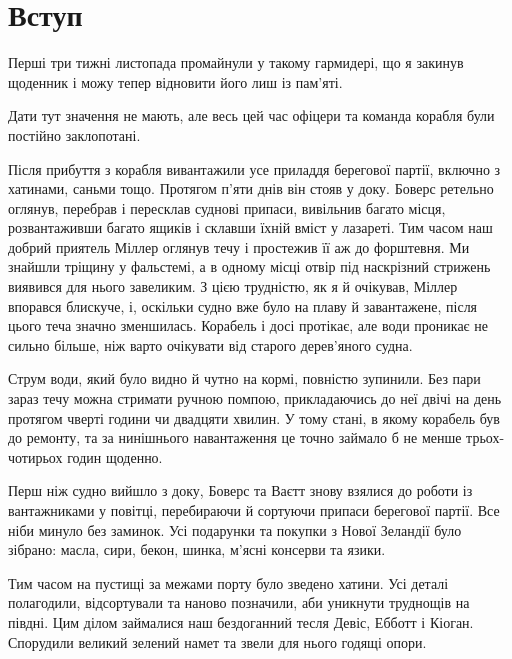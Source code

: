  
 
 
 
 

\section{Вступ}

Перші три тижні листопада промайнули у такому гармидері, що я закинув щоденник
і можу тепер відновити його лиш із пам’яті.

Дати тут значення не мають, але весь цей час офіцери та команда корабля були
постійно заклопотані.

Після прибуття з корабля вивантажили усе приладдя берегової партії, включно з
хатинами, саньми тощо. Протягом п’яти днів він стояв у доку. Боверс ретельно
оглянув, перебрав і пересклав суднові припаси, вивільнив багато місця,
розвантаживши багато ящиків і склавши їхній вміст у лазареті. Тим часом наш
добрий приятель Міллер оглянув течу і простежив її аж до форштевня. Ми знайшли
тріщину у фальстемі, а в одному місці отвір під наскрізний стрижень виявився
для нього завеликим. З цією трудністю, як я й очікував, Міллер впорався
блискуче, і, оскільки судно вже було на плаву й завантажене, після цього теча
значно зменшилась. Корабель і досі протікає, але води проникає не сильно
більше, ніж варто очікувати від старого дерев’яного судна.

Струм води, який було видно й чутно на кормі, повністю зупинили. Без пари зараз
течу можна стримати ручною помпою, прикладаючись до неї двічі на день протягом
чверті години чи двадцяти хвилин. У тому стані, в якому корабель був до
ремонту, та за нинішнього навантаження це точно займало б не менше
трьох-чотирьох годин щоденно.

Перш ніж судно вийшло з доку, Боверс та Ваєтт знову взялися до роботи із
вантажниками у повітці, перебираючи й сортуючи припаси берегової партії. Все
ніби минуло без заминок. Усі подарунки та покупки з Нової Зеландії було
зібрано: масла, сири, бекон, шинка, м’ясні консерви та язики.

Тим часом на пустищі за межами порту було зведено хатини. Усі деталі
полагодили, відсортували та наново позначили, аби уникнути труднощів на півдні.
Цим ділом займалися наш бездоганний тесля Девіс, Ебботт і Кіоган. Спорудили
великий зелений намет та звели для нього годящі опори.

